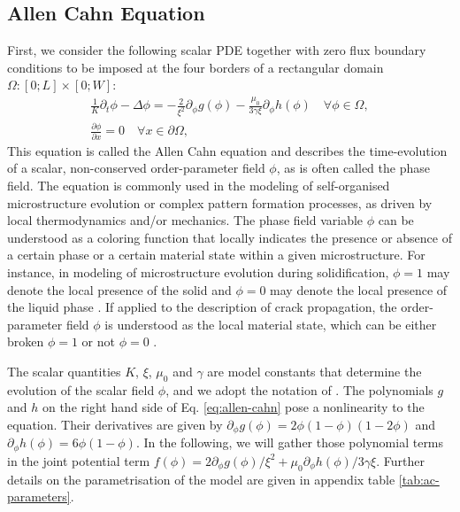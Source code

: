 \documentclass[sn-mathphys,Numbered]{sn-jnl}%
\theoremstyle{thmstyleone}%
\theoremstyle{thmstyletwo}%
\theoremstyle{thmstylethree}%
\begin{document}
\subsection{Allen Cahn Equation}\label{Examples-Allen-Cahn-Equation}

First, we consider the following scalar PDE together with zero flux boundary conditions to be imposed at the four borders of a rectangular domain $\Omega: [0;L]\times[0;W]$:
\begin{align}
    \frac{1}{K} {\partial_t\phi} - \Delta \phi  = -\frac{2}{\xi^2}{\partial_\phi g(\phi)}-\frac{\mu_{0}}{3\gamma\xi}{\partial_\phi h(\phi)} \quad \forall \phi  \in \Omega, \label{eq:allen-cahn} \\
    \frac{\partial \phi}{\partial x}  = 0 \quad \forall x \in \partial \Omega \label{eq:ac-neumann},
\end{align}
This equation is called the Allen Cahn equation and describes the time-evolution of a scalar, non-conserved order-parameter field $\phi$, as is often called the phase field. 
The equation is commonly used in the modeling of self-organised microstructure evolution or complex pattern formation processes, as driven by local thermodynamics and/or mechanics. 
The phase field variable $\phi$ can be understood as a coloring function that locally indicates the presence or absence of a certain phase or a certain material state within a given microstructure. 
For instance, in modeling of microstructure evolution during solidification, $\phi = 1$ may denote the local presence of the solid and $\phi = 0$ may denote the local presence of the liquid phase \cite{fleckSharpPhasefieldModeling2023,fleckFrictionlessMotionDiffuse2022}.
If applied to the description of crack propagation, the order-parameter field $\phi$ is understood as the local material state, which can be either broken $\phi =1$ or not $\phi = 0$ \cite{PilipenkoFleckEmmerich2011,FleckPilipenSpatsch122010}.

The scalar quantities $K$, $\xi$, $\mu_0$ and $\gamma$ are model constants that determine the evolution of the scalar field $\phi$, and we adopt the notation of \cite{FleckFedermannPogorelov2018}. 
The polynomials $g$ and $h$ on the right hand side of Eq. \ref{eq:allen-cahn} pose a nonlinearity to the equation. 
Their derivatives are given by $\partial_\phi g(\phi) = 2 \phi (1 - \phi) (1 - 2\phi)$ and $\partial_\phi h(\phi) = 6 \phi (1 - \phi)$. 
In the following, we will gather those polynomial terms in the joint potential term $f(\phi)= {2}{\partial_\phi g(\phi)}/{\xi^2}+{\mu_{0}}{\partial_\phi h(\phi)}/{3\gamma\xi}$.
Further details on the parametrisation of the model are given in appendix table \ref{tab:ac-parameters}.
\end{document}
